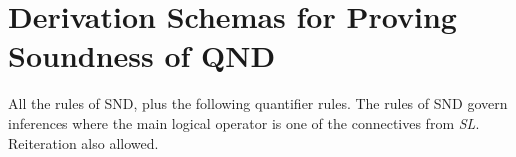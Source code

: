 \iffalse
\begin{itemize}

\item A QL-model $\mathfrak{M} := (D, I)$ consists of a non-empty set $D$ of objects, called the domain of $\mathfrak{M}$, and a map I (the \textit{interpretation} of $\mathfrak{M}$), which maps the vocabulary of $\mathfrak{L}$ to objects and ordered pairs from $D$ such that (1) For each constant $c \in \mathfrak{L}$, $I(c)$ is an element of $D$, called the \textit{referent} or denotation of $c$ and (2) For each k-place predicate $P$ of $\mathfrak{L}$, $I(P)$ is a set of ordered $k$-tuples of objects in $D$, called the \textit{extension} of $P$. ($I$ maps atomic sentences to true or false)

\begin{itemize}

\item For each constant $c \in \mathfrak{L}$, $I(c)$ is an element of $D$, called the \textit{referent} or denotation of $c$

\item For each k-place predicate $P$ of $\mathfrak{L}$, $I(P)$ is a set of ordered $k$-tuples of objects in $D$, called the \textit{extension} of $P$

\end{itemize}
\end{itemize}
\fi 




\newpage

\section*{\hfill \normalsize \bf Derivation Schemas for Proving Soundness of QND \hfill} 
\label{QND-soundness}
				
				\vspace{-1em}
				
All the rules of SND, plus the following quantifier rules. The rules of SND govern inferences where the main logical operator is one of the connectives from {\it{SL}}. Reiteration also allowed.


